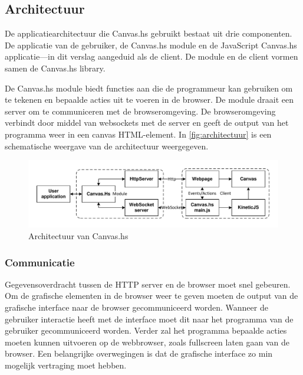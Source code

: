 \subsection{Architectuur}
\label{subsec:architectuur}

De applicatiearchitectuur die Canvas.hs gebruikt bestaat uit drie componenten. De applicatie van de gebruiker, de Canvas.hs module en de JavaScript Canvas.hs applicatie—in dit verslag aangeduid als de client. De module en de client vormen samen de Canvas.hs library.

De Canvas.hs module biedt functies aan die de programmeur kan gebruiken om te tekenen en bepaalde acties uit te voeren in de browser. De module draait een server om te communiceren met de browseromgeving. De browseromgeving verbindt door middel van websockets met de server en geeft de output van het programma weer in een canvas HTML-element. In \autoref{fig:architectuur} is een schematische weergave van de architectuur weergegeven.

\begin{figure}
\begin{center}
\includegraphics[keepaspectratio,width=\textwidth]{./images/architecture.pdf}
\caption{Architectuur van Canvas.hs}
\label{fig:architectuur}
\end{center}
\end{figure}

\subsubsection{Communicatie}
Gegevensoverdracht tussen de HTTP server en de browser moet snel gebeuren. Om de grafische elementen in de browser weer te geven moeten de output van de grafische interface naar de browser gecommuniceerd worden. Wanneer de gebruiker interactie heeft met de interface moet dit naar het programma van de gebruiker gecommuniceerd worden. Verder zal het programma bepaalde acties moeten kunnen uitvoeren op de webbrowser, zoals fullscreen laten gaan van de browser. Een belangrijke overwegingen is dat de grafische interface zo min mogelijk vertraging moet hebben.


